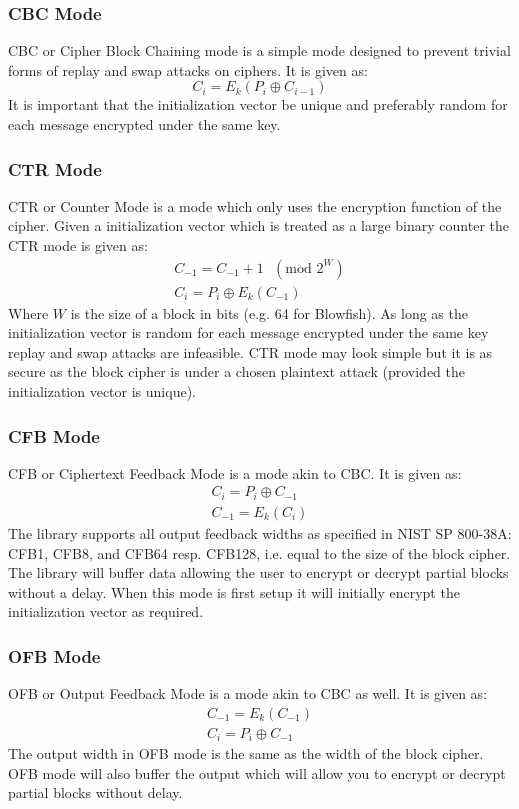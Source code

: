 \documentclass[synpaper]{book}
\begin{document}
\subsubsection{CBC Mode}
CBC or Cipher Block Chaining mode is a simple mode designed to prevent trivial forms of replay and swap attacks on ciphers.
It is given as:
\begin{equation}
C_i = E_k(P_i \oplus C_{i - 1})
\end{equation}
It is important that the initialization vector be unique and preferably random for each message encrypted under the same key.

\subsubsection{CTR Mode}
CTR or Counter Mode is a mode which only uses the encryption function of the cipher.  Given a initialization vector which is
treated as a large binary counter the CTR mode is given as:
\begin{eqnarray}
C_{-1} = C_{-1} + 1\mbox{ }(\mbox{mod }2^W) \nonumber \\
C_i = P_i \oplus E_k(C_{-1})
\end{eqnarray}
Where $W$ is the size of a block in bits (e.g. 64 for Blowfish).  As long as the initialization vector is random for each message
encrypted under the same key replay and swap attacks are infeasible.  CTR mode may look simple but it is as secure
as the block cipher is under a chosen plaintext attack (provided the initialization vector is unique).

\subsubsection{CFB Mode}
CFB or Ciphertext Feedback Mode is a mode akin to CBC.  It is given as:
\begin{eqnarray}
C_i = P_i \oplus C_{-1} \nonumber \\
C_{-1} = E_k(C_i)
\end{eqnarray}
The library supports all output feedback widths as specified in NIST SP 800-38A: CFB1, CFB8, and CFB64 resp. CFB128, i.e. equal
to the size of the block cipher.  The library will buffer data allowing the user to encrypt or decrypt partial
blocks without a delay.  When this mode is first setup it will initially encrypt the initialization vector as required.

\subsubsection{OFB Mode}
OFB or Output Feedback Mode is a mode akin to CBC as well.  It is given as:
\begin{eqnarray}
C_{-1} = E_k(C_{-1}) \nonumber \\
C_i = P_i \oplus C_{-1}
\end{eqnarray}
The output width in OFB mode is the same as the width of the block cipher.  OFB mode will also
buffer the output which will allow you to encrypt or decrypt partial blocks without delay.
\end{document}
